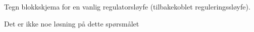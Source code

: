 

Tegn blokkskjema for en vanlig regulatorsl{\o}yfe (tilbakekoblet reguleringssl{\o}yfe).







Det er ikke noe l{\o}sning p{\aa} dette sp{\o}rsm{\aa}let













